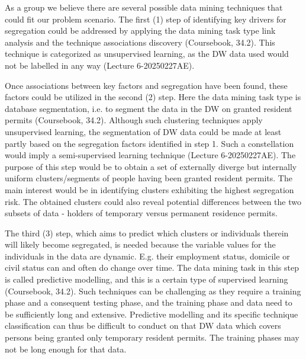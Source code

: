 As a group we believe there are several possible data mining techniques that could fit our problem scenario. 
The first (1) step of identifying key drivers for segregation could be addressed by applying the data mining task type link analysis and 
the technique associations discovery (Coursebook, 34.2). 
This technique is categorized as unsupervised learning,
as the DW data used would not be labelled in any way (Lecture 6-20250227AE).  

Once associations between key factors and segregation have been found, 
these factors could be utilized in the second (2) step. 
Here the data mining task type is database segmentation, 
i.e. to segment the data in the DW on granted resident permits (Coursebook, 34.2). 
Although such clustering techniques apply unsupervised learning, 
the segmentation of DW data could be made at least partly based on the segregation factors identified in step 1. 
Such a constellation would imply a semi-supervised learning technique (Lecture 6-20250227AE). 
The purpose of this step would be to obtain a set of externally diverge but 
internally uniform clusters/segments of people having been granted resident permits. 
The main interest would be in identifying clusters exhibiting the highest segregation risk. 
The obtained clusters could also reveal potential differences between the two subsets of data - 
holders of temporary versus permanent residence permits.  

The third (3) step, which aims to predict which clusters or individuals therein will likely become segregated, 
is needed because the variable values for the individuals in the data are dynamic. 
E.g. their employment status, domicile or civil status can and often do change over time. 
The data mining task in this step is called predictive modelling, and this is a certain type of supervised learning (Coursebook, 34.2). 
Such techniques can be challenging as they require a training phase and a consequent testing phase, 
and the training phase and data need to be sufficiently long and extensive. 
Predictive modelling and its specific technique classification can thus be difficult to conduct on that DW data which 
covers persons being granted only temporary resident permits. The training phases may not be long enough for that data.    